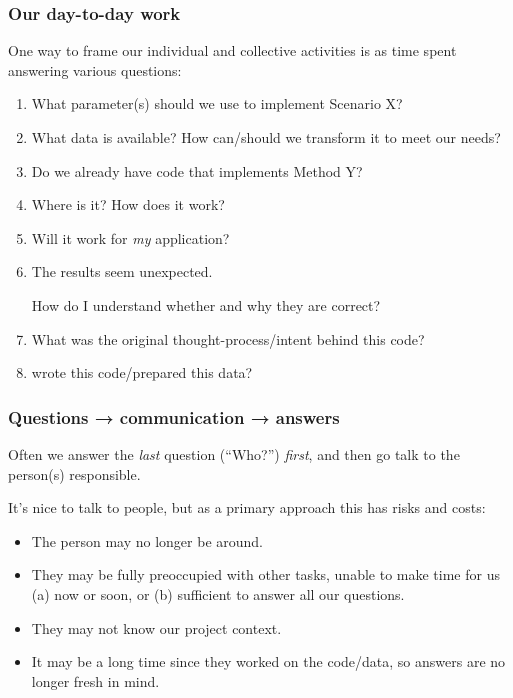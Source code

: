 \documentclass[12pt,aspectratio=169]{beamer}
\begin{document}
\begin{frame}
\frametitle{Our day-to-day work}

One way to frame our individual and collective activities
is as time spent answering various questions:

\begin{enumerate}
  \item What parameter(s) should we use to implement Scenario X?
  \item What data is available?
    How can/should we transform it to meet our needs?
  \item Do we already have code that implements Method Y?
  \item Where is it? How does it work?
  \item Will it work for \emph{my} application?
  \item The results seem unexpected.

    How do I understand whether and why they are correct?
  \item What was the original thought-process/intent behind this code?
  \item {} wrote this code/prepared this data?
\end{enumerate}
\end{frame}

\begin{frame}
\frametitle{Questions → communication → answers}

Often we answer the \emph{last} question (“Who?”) \emph{first},
and then go talk to the person(s) responsible.

\bigskip
It's nice to talk to people, but as a primary approach this has risks and costs:

\begin{itemize}
  \item The person may no longer be around.
  \item They may be fully preoccupied with other tasks,
    unable to make time for us (a) now or soon,
    or (b) sufficient to answer all our questions.
  \item They may not know our project context.
  \item It may be a long time since they worked on the code/data,
    so answers are no longer fresh in mind.
\end{itemize}
\end{frame}
\end{document}
